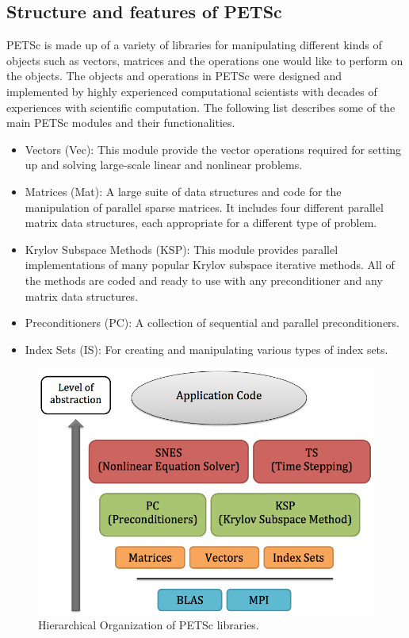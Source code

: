 \subsection{Structure and features of PETSc}
PETSc is made up of a variety of libraries for manipulating different kinds of objects such as vectors, matrices and the operations one would like to perform on the objects. The objects and operations in PETSc were designed and implemented by highly experienced computational scientists with decades of experiences with scientific computation. The following list describes some of the main PETSc modules and their functionalities.

\begin{itemize}
  \item{} Vectors (Vec): This module provide the vector operations required for setting up and solving large-scale linear and nonlinear problems.
  \item{} Matrices (Mat): A large suite of data structures and code for the manipulation of parallel sparse matrices. It includes four different parallel matrix data structures, each appropriate for a different type of problem.
  \item{} Krylov Subspace Methods (KSP): This module provides parallel implementations of many popular Krylov subspace iterative methods. All of the methods are coded and ready to use with any preconditioner and any matrix data structures.
  \item{} Preconditioners (PC): A collection of sequential and parallel preconditioners.
  \item{} Index Sets (IS): For creating and manipulating various types of index sets.
\end{itemize}

\begin{figure}[h!]\label{petscOrganization1}
  \centering
  \includegraphics[width=6in]{figs/petscOrganization1}
  \caption[ PETSc libraries]
   {Hierarchical Organization of PETSc libraries.}
\end{figure}

